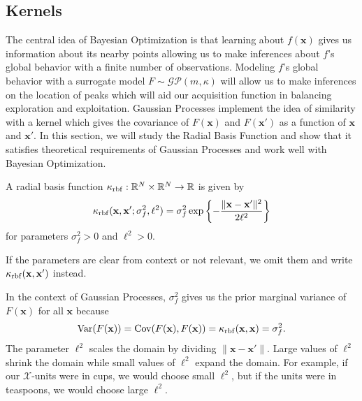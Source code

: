 \subsection{Kernels}\label{ssec:kernel}

The central idea of Bayesian Optimization is that learning about $f(\mathbf{x})$ gives us information about its nearby points allowing us to make inferences about $f$'s global behavior with a finite number of observations.
Modeling $f$'s global behavior with a surrogate model $F \sim \mathcal{GP}(m, \kappa)$ will allow us to make inferences on the location of peaks which will aid our acquisition function in balancing exploration and exploitation.
Gaussian Processes implement the idea of similarity with a kernel which gives the covariance of $F(\mathbf{x})$ and $F(\mathbf{x}')$ as a function of $\mathbf{x}$ and $\mathbf{x}'$.
In this section, we will study the Radial Basis Function and show that it satisfies theoretical requirements of Gaussian Processes and work well with Bayesian Optimization.

\begin{definition}\label{def:rbf}
    A radial basis function $\kappa_{\mathrm{rbf}}: \mathbb{R}^{N} \times \mathbb{R}^{N} \to \mathbb{R}$
    is given by
    \begin{equation}\label{eq:rbf}
        \kappa_{\mathrm{rbf}}(\mathbf{x}, \mathbf{x}'; \sigma_f^2, \ell^2)
        = \sigma_f^{2} \exp \left\{ - \frac{ \lVert \mathbf{x} - \mathbf{x}' \rVert^2 }{ 2 \ell^2 }\right\}
    \end{equation}
    for parameters $\sigma_f^2 > 0$ and $\ell^2 > 0$.

    If the parameters are clear from context or not relevant, we omit them and write $\kappa_{\mathrm{rbf}}(\mathbf{x}, \mathbf{x}')$ instead.
\end{definition}
In the context of Gaussian Processes, $\sigma_f^2$ gives us the prior marginal variance of $F(\mathbf{x})$ for all $\mathbf{x}$ because
\begin{equation*}
    \operatorname{Var}(F(\mathbf{x})) = \operatorname{Cov}(F(\mathbf{x}), F(\mathbf{x})) = \kappa_{\mathrm{rbf}}(\mathbf{x}, \mathbf{x}) = \sigma_f^2.
\end{equation*}
The parameter $\ell^2$ scales the domain by dividing $\lVert \mathbf{x} - \mathbf{x}' \rVert$.
Large values of $\ell^2$ shrink the domain while small values of $\ell^2$ expand the domain.
For example, if our $\mathcal{X}$-units were in cups, we would choose small $\ell^2$, but if the units were in teaspoons, we would choose large $\ell^2$.

